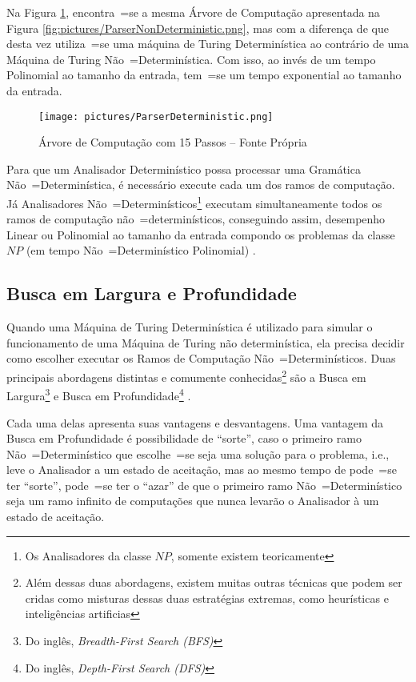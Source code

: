 {    Na Figura \ref{fig:pictures/ParserDeterministic.png},
    encontra~=se a mesma Árvore de Computação apresentada na Figura \ref{fig:pictures/ParserNonDeterministic.png},
    mas com a diferença de que desta vez utiliza~=se uma máquina de Turing Determinística ao contrário de uma Máquina de Turing Não~=Determinística.
    Com isso,
    ao invés de um tempo Polinomial ao tamanho da entrada,
    tem~=se um tempo exponential ao tamanho da entrada.
    \begin{figure}[h]
    \centering
    \texttt{[image: pictures/ParserDeterministic.png]}
    \caption[Árvore de Computação com 15 Passos]{Árvore de Computação com 15 Passos -- Fonte Própria}
    \label{fig:pictures/ParserDeterministic.png}
    \end{figure}

    Para que um Analisador Determinístico possa processar uma Gramática Não~=Determinística,
    é necessário execute cada um dos ramos de computação.
    Já Analisadores Não~=Determinísticos\footnote{
    Os Analisadores da classe $NP$,
    somente existem teoricamente
    }
    executam simultaneamente todos os ramos de computação não~=determinísticos,
    conseguindo assim, desempenho Linear ou
    Polinomial ao tamanho da entrada compondo os problemas da classe $NP$ (em tempo Não~=Determinístico Polinomial) \cite{hopcroftBook}.


\subsection{Busca em Largura e Profundidade}
\label{buscaEmLarguraEProfundidade}

    Quando uma Máquina de Turing Determinística é utilizado para simular o funcionamento de uma Máquina de Turing não determinística,
    ela precisa decidir como escolher executar os Ramos de Computação Não~=Determinísticos.
    Duas principais abordagens distintas e
    comumente conhecidas\footnote{
    Além dessas duas abordagens,
    existem muitas outras técnicas que podem ser cridas como misturas dessas duas estratégias extremas,
    como heurísticas e inteligências artificias
    }
    são a Busca em Largura\footnote{
    Do inglês, \textit{Breadth-First Search (BFS)}
    }
    e Busca em Profundidade\footnote{
    Do inglês, \textit{Depth-First Search (DFS)}
    }
    \cite{cormenIntroductionToAlgorithms}.

    Cada uma delas apresenta suas vantagens e
    desvantagens.
    Uma vantagem da Busca em Profundidade é possibilidade de ``sorte'',
    caso o primeiro ramo Não~=Determinístico que escolhe~=se seja uma solução para o problema,
    i.e.,
    leve o Analisador a um estado de aceitação,
    mas ao mesmo tempo de pode~=se ter ``sorte'',
    pode~=se ter o ``azar'' de que o primeiro ramo Não~=Determinístico seja um ramo infinito de computações que nunca levarão o Analisador à um estado de aceitação.

}
